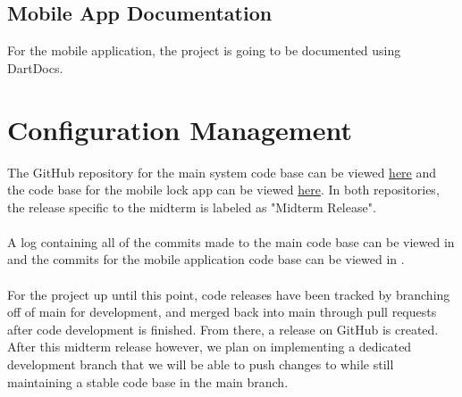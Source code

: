 \subsection{Mobile App Documentation}
For the mobile application, the project is going to be documented using DartDocs.

\section{Configuration Management}
The GitHub repository for the main system code base can be viewed \href{https://github.com/CIS-350/lock}{here} and the code base for the mobile lock app can be viewed \href{https://github.com/CIS-350/lock_app}{here}. In both repositories, the release specific to the midterm is labeled as "Midterm Release".\\
\\
A log containing all of the commits made to the main code base can be viewed in \hyperlink{mainlog}{\color{blue}{Appendix 8.1}} and the commits for the mobile application code base can be viewed in \hyperlink{applog}{\color{blue}{Appendix 8.2}}.\\
\\
For the project up until this point, code releases have been tracked by branching off of main for development, and merged back into main through pull requests after code development is finished. From there, a release on GitHub is created. After this midterm release however, we plan on implementing a dedicated development branch that we will be able to push changes to while still maintaining a stable code base in the main branch.
